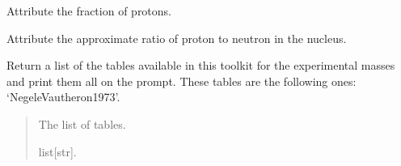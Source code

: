 \documentclass[letterpaper,10pt,english]{sphinxmanual}
\begin{document}
\begin{fulllineitems}

\begin{fulllineitems}
\label{\detokenize{source/api/setup_crust:nucleardatapy.setup_crust.SetupCrust.xp}}
\pysigstartsignatures
\pysigline
{}
\pysigstopsignatures
\sphinxAtStartPar
Attribute the fraction of protons.

\end{fulllineitems}


\begin{fulllineitems}
\label{\detokenize{source/api/setup_crust:nucleardatapy.setup_crust.SetupCrust.xpn_bound}}
\pysigstartsignatures
\pysigline
{}
\pysigstopsignatures
\sphinxAtStartPar
Attribute the approximate ratio of proton to neutron in the nucleus.

\end{fulllineitems}


\end{fulllineitems}


\begin{fulllineitems}
\label{\detokenize{source/api/setup_crust:nucleardatapy.setup_crust.models_crust}}
\pysigstartsignatures
\pysiglinewithargsret
{}
{}
{}
\pysigstopsignatures
\sphinxAtStartPar
Return a list of the tables available in this toolkit for the experimental masses and
print them all on the prompt. These tables are the following
ones: ‘Negele\sphinxhyphen{}Vautheron\sphinxhyphen{}1973’.
\begin{quote}\begin{description}
\sphinxAtStartPar
The list of tables.

\sphinxAtStartPar
list{[}str{]}.

\end{description}\end{quote}

\end{fulllineitems}
\end{document}
